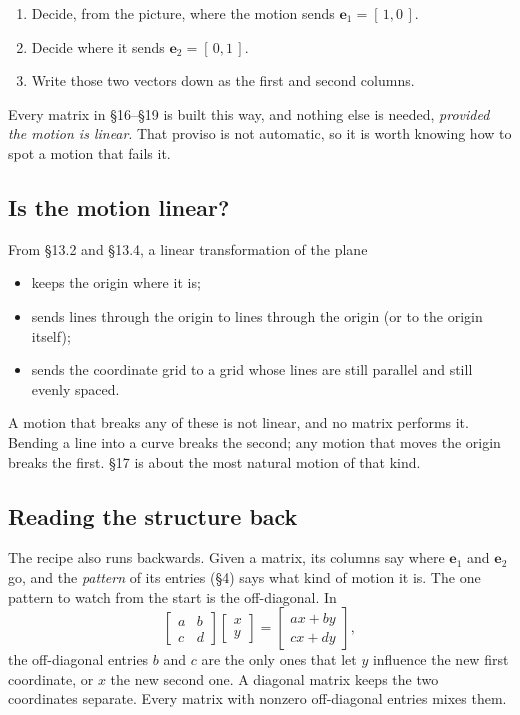 \documentclass[11pt]{article}
\theoremstyle{plain}
\theoremstyle{definition}
\theoremstyle{remark}
\newcommand{\vc}[1]{\mathbf{#1}}
\begin{document}
\begin{enumerate}[label=\textbf{Step \arabic*.},leftmargin=4.2em,itemsep=3pt]
  \item Decide, from the picture, where the motion sends $\vc{e}_1=[\,1,0\,]$.
  \item Decide where it sends $\vc{e}_2=[\,0,1\,]$.
  \item Write those two vectors down as the first and second columns.
\end{enumerate}

\noindent Every matrix in \S16--\S19 is built this way, and nothing else is
needed, \emph{provided the motion is linear}. That proviso is not automatic, so
it is worth knowing how to spot a motion that fails it.

\subsection{Is the motion linear?}
From \S13.2 and \S13.4, a linear transformation of the plane
\begin{itemize}[leftmargin=1.4em,itemsep=2pt]
  \item keeps the origin where it is;
  \item sends lines through the origin to lines through the origin (or to the
        origin itself);
  \item sends the coordinate grid to a grid whose lines are still parallel and
        still evenly spaced.
\end{itemize}
A motion that breaks any of these is not linear, and no matrix performs it.
Bending a line into a curve breaks the second; any motion that moves the origin
breaks the first. \S17 is about the most natural motion of that kind.

\subsection{Reading the structure back}
The recipe also runs backwards. Given a matrix, its columns say where
$\vc{e}_1$ and $\vc{e}_2$ go, and the \emph{pattern} of its entries (\S4) says
what kind of motion it is. The one pattern to watch from the start is the
off-diagonal. In
\[
  \begin{bmatrix}a&b\\c&d\end{bmatrix}
  \begin{bmatrix}x\\y\end{bmatrix}
  =\begin{bmatrix}ax+by\\cx+dy\end{bmatrix},
\]
the off-diagonal entries $b$ and $c$ are the only ones that let $y$ influence
the new first coordinate, or $x$ the new second one. A diagonal matrix keeps
the two coordinates separate. Every matrix with nonzero off-diagonal entries
mixes them.
\end{document}
